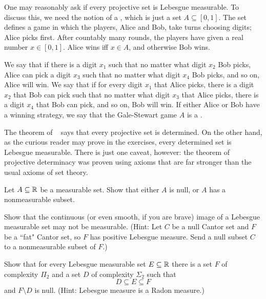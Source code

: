 \begin{subsec}
One may reasonably ask if every projective set is Lebesgue measurable.
To discuss this, we need the notion of a , which is just a set $A \subseteq [0, 1]$.
The set defines a game in which the players, Alice and Bob, take turns choosing digits; Alice picks first.
After countably many rounds, the players have given a real number $x \in [0, 1]$.
Alice wins iff $x \in A$, and otherwise Bob wins.

We say that  if there is a digit $x_1$ such that no matter what digit $x_2$ Bob picks, Alice can pick a digit $x_3$ such that no matter what digit $x_4$ Bob picks, and so on, Alice will win.
We say that  if for every digit $x_1$ that Alice picks, there is a digit $x_2$ that Bob can pick such that no matter what digit $x_3$ that Alice picks, there is a digit $x_4$ that Bob can pick, and so on, Bob will win.
If either Alice or Bob have a winning strategy, we say that the Gale-Stewart game $A$ is a .

The theorem of ~\cite{SteelMartin10.2307/1990913} says that every projective set is determined.
On the other hand, as the curious reader may prove in the exercises, every determined set is Lebesgue measurable.
There is just one caveat, however: the theorem of projective determinacy was proven using axioms that are far stronger than the usual axioms of set theory.
\end{subsec}

\begin{exercise}
Let $A \subseteq \mathbb{R}$ be a measurable set.
Show that either $A$ is null, or $A$ has a nonmeasurable subset.
\end{exercise}

\begin{exercise}
Show that the continuous (or even smooth, if you are brave) image of a Lebesgue measurable set may not be measurable.
(Hint: Let $C$ be a null Cantor set and $F$ be a ``fat" Cantor set, so $F$ has positive Lebesgue measure.
Send a null subset $C$ to a nonmeasurable subset of $F$.)
\end{exercise}

\begin{exercise}
Show that for every Lebesgue measurable set $E \subseteq \mathbb{R}$ there is a set $F$ of complexity $\Pi_2$ and a set $D$ of complexity $\Sigma_2$ such that
$$D \subseteq E \subseteq F$$
and $F \setminus D$ is null. (Hint: Lebesgue measure is a Radon measure.)
\end{exercise}

